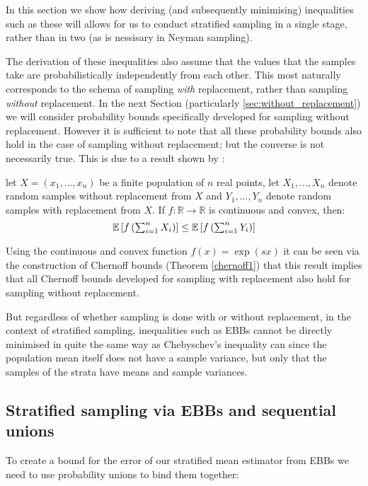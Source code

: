 In this section we show how deriving (and subsequently minimising) inequalities such as these will allows for us to conduct stratified sampling in a single stage, rather than in two (as is nessisary in Neyman sampling).

The derivation of these inequalities also assume that the values that the samples take are probabilistically independently from each other.  This most naturally corresponds to the schema of sampling \textit{with} replacement, rather than sampling \textit{without} replacement.
In the next Section (particularly \ref{sec:without_replacement}) we will consider probability bounds specifically developed for sampling without replacement. However it is sufficient to note that all these probability bounds also hold in the case of sampling without replacement; but the converse is not necessarily true. 
This is due to a result shown by \cite{hoeffding1}:

\begin{lemma}\label{hoeffdings_reduction}
let $X=(x_1,\dots,x_n)$ be a finite population of $n$ real points, let $X_1,\dots,X_n$ denote random samples without replacement from $X$ and $Y_1,\dots,Y_n$ denote random samples with replacement from $X$. 
If $f:\mathbb{R}\rightarrow\mathbb{R}$ is continuous and convex, then:
$$\textstyle \operatorname{\mathbb{E}}\left[f\left(\sum_{i=1}^nX_i\right)\right]\le\operatorname{\mathbb{E}}\left[f\left(\sum_{i=1}^nY_i\right)\right] $$
\end{lemma}

Using the continuous and convex function $f(x)=\exp(sx)$ it can be seen via the construction of Chernoff bounds (Theorem \ref{chernoff1}) that this result implies that all Chernoff bounds developed for sampling with replacement also hold for sampling without replacement.

But regardless of whether sampling is done with or without replacement, in the context of stratified sampling, inequalities such as EBBs cannot be directly minimised in quite the same way as Chebyschev's inequality can since the population mean itself does not have a sample variance, but only that the samples of the strata have means and sample variances.

\subsection{Stratified sampling via EBBs and sequential unions}

To create a bound for the error of our stratified mean estimator from EBBs we need to use probability unions to bind them together:

